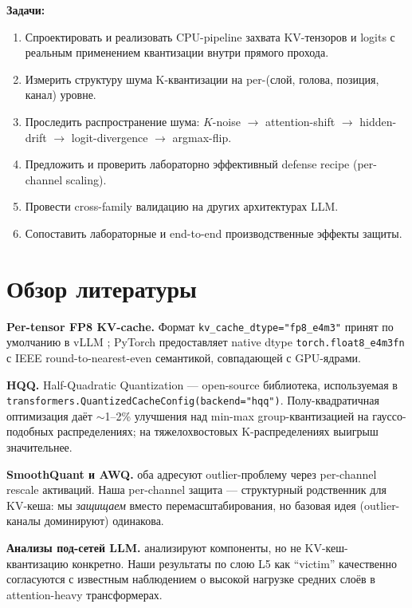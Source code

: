 \documentclass[a4paper,12pt]{article}
\begin{document}
\textbf{Задачи:}
\begin{enumerate}[label=\arabic*.,leftmargin=*]
\item Спроектировать и реализовать CPU-pipeline захвата KV-тензоров и logits с реальным применением квантизации внутри прямого прохода.
\item Измерить структуру шума K-квантизации на per-(слой, голова, позиция, канал) уровне.
\item Проследить распространение шума: $K$-noise $\to$ attention-shift $\to$ hidden-drift $\to$ logit-divergence $\to$ argmax-flip.
\item Предложить и проверить лабораторно эффективный defense recipe (per-channel scaling).
\item Провести cross-family валидацию на других архитектурах LLM.
\item Сопоставить лабораторные и end-to-end производственные эффекты защиты.
\end{enumerate}

\section{Обзор литературы}

\textbf{Per-tensor FP8 KV-cache.} Формат \texttt{kv\_cache\_dtype="fp8\_e4m3"} принят по умолчанию в vLLM \cite{kwon2023}; PyTorch предоставляет native dtype \texttt{torch.float8\_e4m3fn} с IEEE round-to-nearest-even семантикой, совпадающей с GPU-ядрами.

\textbf{HQQ.} Half-Quadratic Quantization \cite{badri2023} --- open-source библиотека, используемая в \texttt{transformers.QuantizedCacheConfig(backend="hqq")}. Полу-квадратичная оптимизация даёт $\sim$1--2\% улучшения над min-max group-квантизацией на гауссо-подобных распределениях; на тяжелохвостовых K-распределениях выигрыш значительнее.

\textbf{SmoothQuant и AWQ.} \cite{xiao2023smoothquant,lin2024awq} оба адресуют outlier-проблему через per-channel rescale активаций. Наша per-channel защита --- структурный родственник для KV-кеша: мы \textit{защищаем} вместо перемасштабирования, но базовая идея (outlier-каналы доминируют) одинакова.

\textbf{Анализы под-сетей LLM.} \cite{olah2020zoom,templeton2024scaling} анализируют компоненты, но не KV-кеш-квантизацию конкретно. Наши результаты по слою L5 как ``victim'' качественно согласуются с известным наблюдением о высокой нагрузке средних слоёв в attention-heavy трансформерах.
\end{document}
